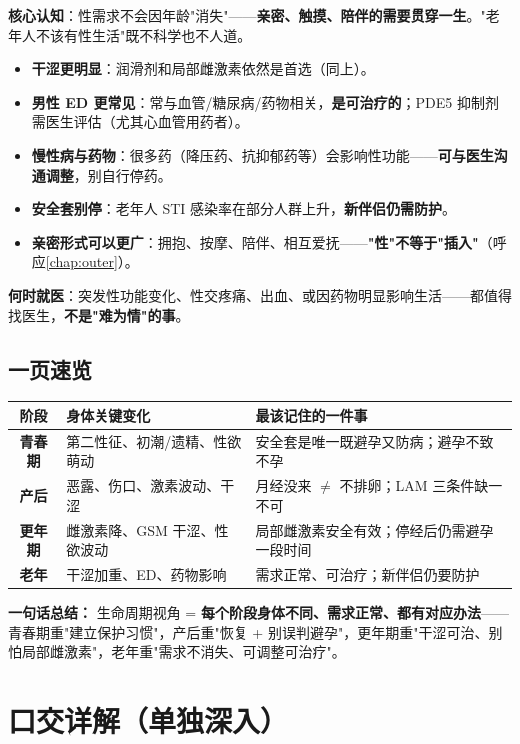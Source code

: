 \documentclass[12pt,UTF8,openany]{ctexbook}
\begin{document}
\textbf{核心认知}：性需求不会因年龄"消失"——\textbf{亲密、触摸、陪伴的需要贯穿一生}。"老年人不该有性生活"既不科学也不人道。

\begin{itemize}[leftmargin=2em,itemsep=0.3em]
  \item \textbf{干涩更明显}：润滑剂和局部雌激素依然是首选（同上）。
  \item \textbf{男性 ED 更常见}：常与血管/糖尿病/药物相关，\textbf{是可治疗的}；PDE5 抑制剂需医生评估（尤其心血管用药者）。
  \item \textbf{慢性病与药物}：很多药（降压药、抗抑郁药等）会影响性功能——\textbf{可与医生沟通调整}，别自行停药。
  \item \textbf{安全套别停}：老年人 STI 感染率在部分人群上升，\textbf{新伴侣仍需防护}。
  \item \textbf{亲密形式可以更广}：拥抱、按摩、陪伴、相互爱抚——\textbf{"性"不等于"插入"}（呼应\ref{chap:outer}）。
\end{itemize}

\textbf{何时就医}：突发性功能变化、性交疼痛、出血、或因药物明显影响生活——都值得找医生，\textbf{不是"难为情"的事}。

\section{一页速览}

\begin{tabularx}{\linewidth}{C X X}
\toprule
\textbf{阶段} & \textbf{身体关键变化} & \textbf{最该记住的一件事} \\
\midrule
\textbf{青春期} & 第二性征、初潮/遗精、性欲萌动 & 安全套是唯一既避孕又防病；避孕不致不孕 \\
\textbf{产后} & 恶露、伤口、激素波动、干涩 & 月经没来 $\ne$ 不排卵；LAM 三条件缺一不可 \\
\textbf{更年期} & 雌激素降、GSM 干涩、性欲波动 & 局部雌激素安全有效；停经后仍需避孕一段时间 \\
\textbf{老年} & 干涩加重、ED、药物影响 & 需求正常、可治疗；新伴侣仍要防护 \\
\bottomrule
\end{tabularx}

\vspace{1em}
\noindent\textbf{一句话总结：} 生命周期视角 = \textbf{每个阶段身体不同、需求正常、都有对应办法}——青春期重"建立保护习惯"，产后重"恢复 + 别误判避孕"，更年期重"干涩可治、别怕局部雌激素"，老年重"需求不消失、可调整可治疗"。

\chapter{口交详解（单独深入）}
\label{chap:oral}
\end{document}
